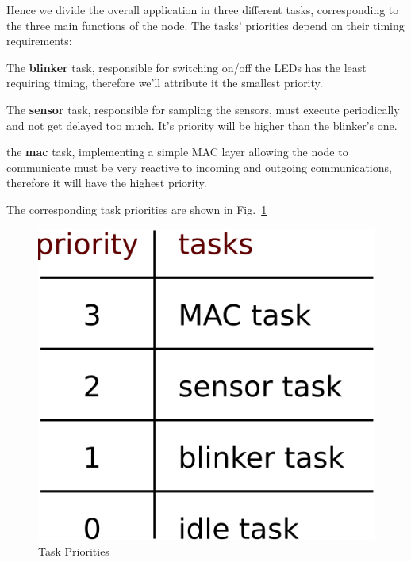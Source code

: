 \documentclass[11pt]{report}
\begin{document}
Hence we divide the overall application in three different tasks, corresponding to the three main functions of the node. The tasks' priorities depend on their timing requirements:

The \textbf{blinker} task, responsible for switching on/off the LEDs has the least requiring timing, therefore we'll attribute it the smallest priority.

The \textbf{sensor} task, responsible for sampling the sensors, must execute periodically and not get delayed too much. It's priority will be higher than the blinker's one.

the \textbf{mac} task, implementing a simple MAC layer allowing the node to communicate must be very reactive to incoming and outgoing communications, therefore it will have the highest priority.

The corresponding task priorities are shown in Fig.~\ref{fig:prio}

\begin{figure}[ht]
	\begin{center}
	\includegraphics[scale=1]{figures/prio.png}
	\end{center}
	\caption{Task Priorities}
	\label{fig:prio}
\end{figure}
\end{document}
